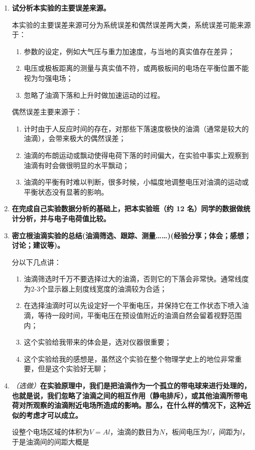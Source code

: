 \documentclass[11pt,a4paper]{ctexart}
\begin{document}
\begin{enumerate}
\item \textbf{试分析本实验的主要误差来源。}\par
本实验的主要误差来源可分为系统误差和偶然误差两大类，系统误差可能来源于：
\begin{enumerate}
\item 参数的设定，例如大气压与重力加速度，与当地的真实值存在差异；
\item 电压或极板距离的测量与真实值不符，或两极板间的电场在平衡位置不能视为匀强电场；
\item 忽略了油滴下落和上升时做加速运动的过程。
\end{enumerate}
偶然误差主要来源于：
\begin{enumerate}
\item 计时由于人反应时间的存在，对那些下落速度极快的油滴（通常是较大的油滴），会带来极大的偶然误差；
\item 油滴的布朗运动或飘动使得电荷下落的时间偏大，在实验中事实上观察到油滴有时会做很明显的水平飘动；
\item 油滴的平衡有时难以判断，很多时候，小幅度地调整电压对油滴的运动或平衡状态没有显著的影响。
\end{enumerate}
\item \textbf{在完成自己实验数据分析的基础上，把本实验班（约 12 名）同学的数据做统计分析，并与电子电荷值比较。}
\item \textbf{密立根油滴实验的总结(油滴筛选、跟踪、测量……)(经验分享；体会；感想；讨论；建议等)。}\par
分以下几点讲：
\begin{enumerate}
\item 油滴筛选时千万不要选择过大的油滴，否则它的下落会非常快。通常线度为2-3个显示器上刻度线宽度的油滴较为合适；
\item 在选择油滴时可以先设定好一个平衡电压，并保持它在工作状态下喷入油滴，等待一段时间，平衡电压在预设值附近的油滴自然会留着视野范围内；
\item 这个实验给我带来的体会是，选对仪器很重要；
\item 这个实验给我的感想是，虽然这个实验在整个物理学史上的地位非常重要，但是这个实验好无聊；
\end{enumerate}
\item \emph{（选做）}\textbf{在实验原理中，我们是把油滴作为一个孤立的带电球来进行处理的，也就是说，我们忽略了油滴之间的相互作用（静电排斥），或其他油滴所带电荷对所观察的油滴附近电场所造成的影响。那么，在什么样的情况下，这种近似的考虑才可以成立。}\par
设整个电场区域的体积为$V=Al$，油滴的数目为$N$，板间电压为$U$，间距为$l$，于是油滴间的间距大概是

\end{enumerate}
\end{document}
